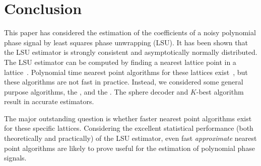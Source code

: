 \documentclass[journal]{IEEEtran}
\begin{document}
\section{Conclusion} \label{sec:conclusion}
 
This paper has considered the estimation of the coefficients of a noisy polynomial phase signal by least squares phase unwrapping (LSU). It has been shown that the LSU estimator is strongly consistent and asymptotically normally distributed. %
The LSU estimator can be computed by finding a nearest lattice point in a lattice~\cite{McKilliam2009asilomar_polyest_lattice}.  %
Polynomial time nearest point algorithms for these lattices exist~\cite[Sec 4.3]{McKilliam2010thesis}, but these algorithms are not fast in practice.  Instead, we considered some general purpose algorithms, the ,  and the . The sphere decoder and $K$-best algorithm result in accurate estimators.

The major outstanding question is whether faster nearest point algorithms exist for these specific lattices.  Considering the excellent statistical performance (both theoretically and practically) of the LSU estimator, even fast \emph{approximate} nearest point algorithms are likely to prove useful for the estimation of polynomial phase signals. 


 
\small 
 


\normalsize
\end{document}
